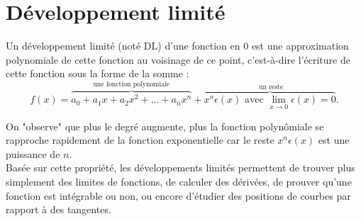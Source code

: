 \documentclass{book}
\begin{document}
\chapter*{Développement limité}
Un développement limité (noté DL) d'une fonction en 0 est une approximation polynomiale de cette fonction au voisinage de ce point, c'est-à-dire l'écriture de cette fonction sous la forme de la somme :
$$ f(x)=\overbrace{a_{0}+a_{1}x+a_{2}x^{2}+...+a_{n}x^{n}}^{\text{une fonction polynomiale}}+\overbrace{x^{n}\epsilon(x)\text{ avec }
 \lim _{x\rightarrow 0}\epsilon(x)=0}^{\text{ un reste}}.$$
 \begin{center}
 \end{center}
On "observe" que plus le degré augmente, plus la fonction polynômiale se rapproche rapidement de la fonction exponentielle  car le reste $x^{n}\epsilon(x)$ est une puissance de $n$.\\   
Basée sur cette propriété, les développements limités permettent de trouver plus simplement des limites de fonctions, de calculer des dérivées, de prouver qu'une fonction est intégrable ou non, ou encore d'étudier des positions de courbes par rapport à des tangentes.
\end{document}

